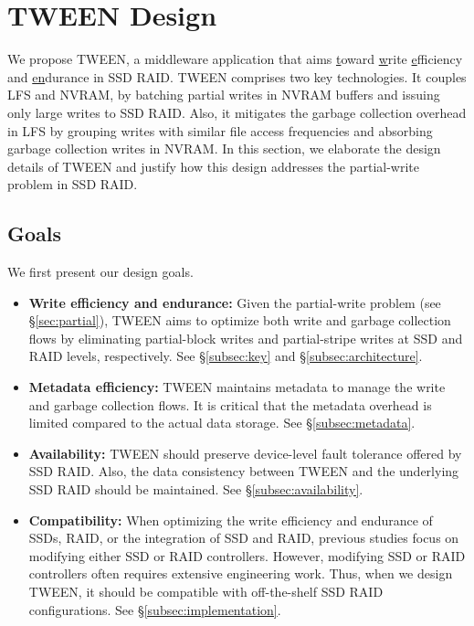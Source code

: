 \section{TWEEN Design}
\label{sec:design}

We propose TWEEN, a middleware application that aims \underline{t}oward
\underline{w}rite \underline{e}fficiency and \underline{en}durance in SSD
RAID.  TWEEN comprises two key technologies.  It couples LFS and NVRAM, by
batching partial writes in NVRAM buffers and issuing only large writes to SSD
RAID.  Also, it mitigates the garbage collection overhead in LFS by grouping
writes with similar file access frequencies and absorbing garbage collection
writes in NVRAM.  In this section, we elaborate the design details of
TWEEN and justify how this design addresses the partial-write problem in SSD
RAID.  


\subsection{Goals}

We first present our design goals.
\vspace{-3pt}
\begin{itemize} \itemsep=1pt
\item {\bf Write efficiency and endurance:}  Given the partial-write problem
(see \S\ref{sec:partial}), TWEEN aims to optimize both
write and garbage collection flows by eliminating partial-block writes and
partial-stripe writes at SSD and RAID levels, respectively.  
See \S\ref{subsec:key} and \S\ref{subsec:architecture}. 
\item {\bf Metadata efficiency:}  TWEEN maintains metadata to manage the write
and garbage collection flows.  It is critical that the metadata overhead is
limited compared to the actual data storage.  See \S\ref{subsec:metadata}.
\item {\bf Availability:}  TWEEN should preserve device-level fault tolerance
offered by SSD RAID. Also, the data consistency between TWEEN and the underlying
SSD RAID should be maintained. See \S\ref{subsec:availability}.  
\item {\bf Compatibility:}  When optimizing the write efficiency and endurance
of SSDs, RAID, or the integration of SSD and RAID, previous studies 
focus on modifying either SSD or RAID
controllers.  However, modifying SSD or RAID controllers often requires
extensive engineering work.  Thus, when we design TWEEN, it should be
compatible with off-the-shelf SSD RAID configurations.  
See \S\ref{subsec:implementation}.
\end{itemize}


